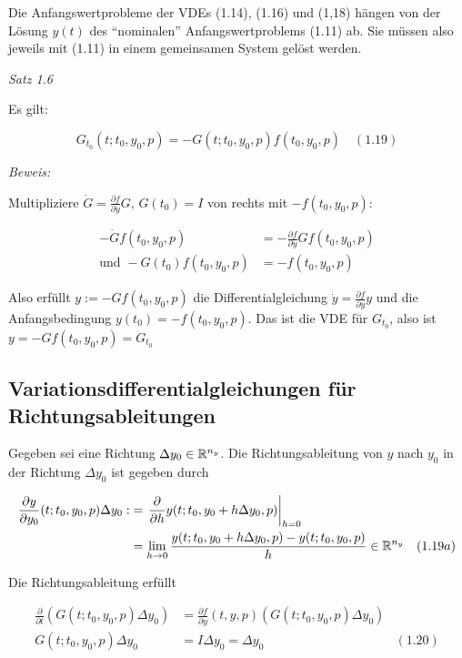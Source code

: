 Die Anfangswertprobleme der VDEs (1.14), (1.16) und (1,18) hängen von der Lösung $y(t)$ des "`nominalen"' Anfangswertproblems (1.11) ab. Sie müssen also jeweils mit (1.11) in einem gemeinsamen System gelöst werden.

\emph{Satz 1.6}

Es gilt:

\[ G_{t_0} (t; t_0, y_0, p) = -G(t; t_0, y_0, p) f(t_0, y_0, p) \quad (1.19) \]

\emph{Beweis:}

Multipliziere $\dot G = \tfrac{\partial f}{\partial y} G$, $G(t_0) = I$ von rechts mit $-f(t_0, y_0, p):$

\begin{align*}
-\dot G f(t_0,y_0,p) &= -\frac{\partial f}{\partial y} G f(t_0, y_0, p) \\
\text{und } -G(t_0) f(t_0, y_0, p) &= -f(t_0, y_0, p)
\end{align*}

Also erfüllt $y := -G f(t_0, y_0, p)$ die Differentialgleichung $\dot y = \tfrac{\partial f}{\partial y} y$ und die Anfangsbedingung $y(t_0) = -f(t_0, y_0, p)$. Das ist die VDE für $G_{t_0}$, also ist $y = -G f(t_0, y_0, p) = G_{t_0}$

\subsection*{Variationsdifferentialgleichungen für Richtungsableitungen}

Gegeben sei eine Richtung $\Delta y_0 \in \mathbb{R}^{n_y}$. Die Richtungsableitung von $y$ nach $y_0$ in der Richtung $\Delta y_0$ ist gegeben durch

\begin{align*}
\frac{\partial y}{\partial y_0} (t; t_0, y_0, p) \Delta y_0 :&= \left. \frac \partial{\partial h} y(t; t_0, y_0 + h \Delta y_0, p) \right|_{h=0} \\
&= \lim_{h \to 0} \frac{y(t; t_0, y_0 + h \Delta y_0, p) - y(t; t_0, y_0, p)}{h} \in \mathbb{R}^{n_y} & (1.19a)
\end{align*}

Die Richtungsableitung erfüllt

\begin{align*}
\frac{\partial}{\partial t}(G(t; t_0, y_0, p) \Delta y_0) &= \frac{\partial f}{\partial y} (t,y,p) (G(t;t_0,y_0,p)\Delta y_0) \\
G(t;t_0,y_0,p) \Delta y_0 &= I\Delta y_0 = \Delta y_0 & (1.20)
\end{align*}

